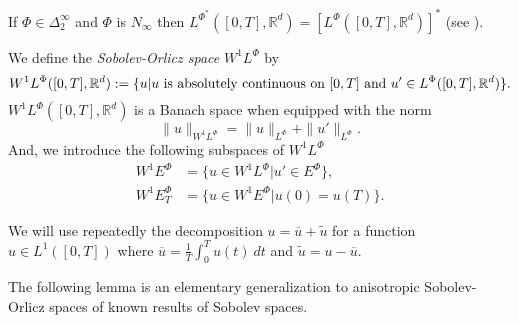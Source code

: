 \documentclass[twoside]{article}
\theoremstyle{remark}
\newcommand{\orlnor}{\|_{L^{\Phi}}}
\newcommand{\lphi}{L^{\Phi}}
\newcommand{\lpsi}{L^{\Phi^*}}
\newcommand{\ephi}{E^{\Phi}}
\newcommand{\wphi}{W^{1}\lphi}
\newcommand{\wphie}{W^{1}\ephi}
\newcommand{\rr}{\mathbb{R}}
\renewcommand{\leq}{\leqslant}
\newcounter{example}
\begin{document}
 If $\Phi \in \Delta_2^{\infty}$ and $\Phi$ is $N_{\infty}$ then $\lpsi([0,T],\rr^d)= \left[\lphi([0,T],\rr^d)\right]^*$  (see \cite[Thm. 2.9 , Thm. 2.10]{Desch2001}).





We define the \emph{Sobolev-Orlicz space} $\wphi$ by
\[\wphi([0,T],\rr^d):=\{u| u \hbox{ is absolutely continuous on $[0,T]$ and } u'\in \lphi([0,T],\rr^d)\}.\]
$\wphi([0,T],\rr^d)$ is a Banach space when equipped with the norm
\begin{equation}\label{def-norma-orlicz-sob}
\|  u  \|_{\wphi}= \|  u  \|_{\lphi} + \|u'\orlnor.
\end{equation}
And, we introduce the following subspaces of $\wphi$
\begin{equation}\label{def-esp-orlicz-sob-per}
\begin{split}
\wphie&=\{u\in\wphi|u'\in\ephi\},\\
\wphie_T&=\{u\in\wphie|u(0)=u(T)\}.
\end{split}
\end{equation}

%
%
 We will use repeatedly the decomposition $u=\overline{u}+\widetilde{u}$ for a function $u\in L^1([0,T])$  where $\overline{u} =\frac1T\int_0^T u(t)\ dt$ and $\widetilde{u}=u-\overline{u}$.

 The following lemma is an elementary generalization to anisotropic Sobolev-Orlicz spaces of known results of Sobolev spaces.


%
%
%
%
%
%
%
%
%
%
\end{document}
